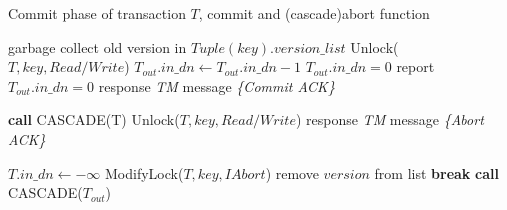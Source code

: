 \documentclass[conference]{IEEEtran}
\begin{document}
\begin{algorithm}[!h]
  \caption{Commit phase of transaction ${T}$, commit and (cascade)abort function}
  \begin{algorithmic}[1]
    \State garbage collect old version in \newline ${Tuple(key).version\_list}$
      \State Unlock(${T, key, Read/Write}$)
    \EndFor
      \State ${T_{out}.in\_dn \gets T_{out}.in\_dn - 1}$ 
      \If ${T_{out}.in\_dn = 0}$ 
        \State report ${T_{out}.in\_dn = 0}$ 
      \EndIf
    \EndFor
    \State response \emph{TM} message \emph{\{Commit ACK\}}
    \label{func:commit}
  \EndFunction
  \end{algorithmic}
  \begin{algorithmic}[1]
    \State \textbf{call} CASCADE(T)
      \State Unlock(${T, key, Read/Write}$)
    \EndFor
    \State response \emph{TM} message \emph{\{Abort ACK\}}
    \label{func:abort}
  \EndFunction
  \end{algorithmic}
  \begin{algorithmic}[1]
      \State ${T.in\_dn \gets -\infty }$
          \State ModifyLock($T, key, IAbort$)
        \EndIf
            \State remove ${version}$ from list
            \State \textbf{break}
          \EndIf 
        \EndFor
      \EndFor
        \State \textbf{call} CASCADE(${T_{out}}$)
      \EndFor
      \label{func:cascade}
    \EndFunction
  \end{algorithmic}
  \label{alg:commit_phase}
\end{algorithm}
\end{document}
